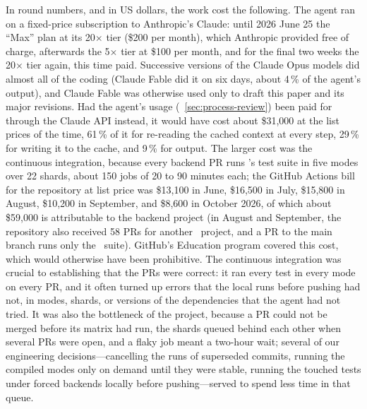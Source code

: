 In round numbers, and in US dollars, the work cost the following. The
agent ran on a fixed-price subscription to Anthropic's Claude: until
2026 June 25 the ``Max'' plan at its 20$\times$ tier (\$200 per month),
which Anthropic provided free of charge, afterwards the 5$\times$ tier
at \$100 per month, and for the final two weeks the 20$\times$ tier
again, this time paid. Successive versions of the Claude Opus models
did almost all of the coding (Claude Fable did it on six days, about
4\,\% of the agent's output), and Claude Fable was otherwise used only
to draft this paper and its major revisions. Had the agent's usage
(\sectionname~\ref{sec:process-review}) been paid for through the
Claude API instead, it would have cost about \$31,000 at the list
prices of the time, 61\,\% of it for re-reading the cached context at
every step, 29\,\% for writing it to the cache, and 9\,\% for output.
The larger cost was the continuous integration, because every
backend PR runs \galpy's test suite in five modes over 22 shards, about
150 jobs of 20 to 90 minutes each; the GitHub Actions bill for the
repository at list price was \$13,100 in June, \$16,500 in July,
\$15,800 in August, \$10,200 in September, and \$8,600 in October 2026,
of which about \$59,000 is attributable to the backend project (in
August and September, the repository also received 58 PRs for another
\galpy\ project, and a PR to the main branch runs only the \numpy\
suite). GitHub's Education program covered this cost, which would
otherwise have been prohibitive. The continuous integration was
crucial to establishing that the PRs were correct: it ran every test
in every mode on every PR, and it often turned up errors that the local
runs before pushing had not, in modes, shards, or versions of the
dependencies that the agent had not tried. It was also the bottleneck
of the project, because a PR could not be merged before its matrix had
run, the shards queued behind each other when several PRs were open,
and a flaky job meant a two-hour wait; several of our engineering
decisions---cancelling the runs of superseded commits, running the
compiled modes only on demand until they were stable, running the
touched tests under forced backends locally before pushing---served to
spend less time in that queue.

